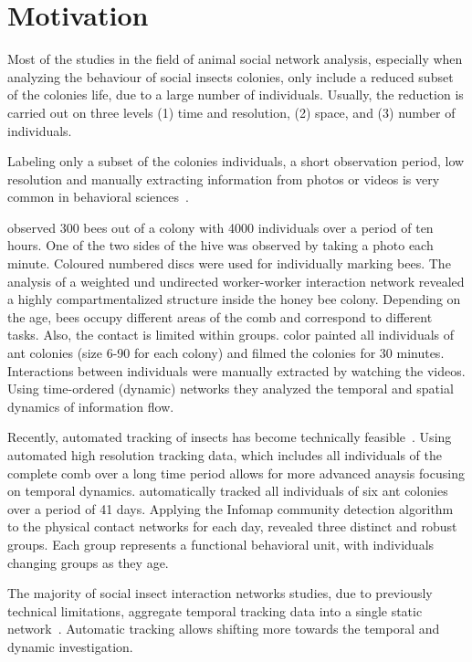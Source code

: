 \section{Motivation}
Most of the studies in the field of animal social network analysis, especially when analyzing the behaviour of social insects colonies, only include a reduced subset of the colonies life, due to a large number of individuals. Usually, the reduction is carried out on three levels (1) time and resolution, (2) space, and (3) number of individuals.

Labeling only a subset of the colonies individuals, a short observation period, low resolution and manually extracting information from photos or videos is very common in behavioral sciences~\cite{naug2008structure, quevillon2015social}.

\textcite{baracchi2014socio} observed 300 bees out of a colony with 4000 individuals over a period of ten hours. One of the two sides of the hive was observed by taking a photo each minute. Coloured numbered discs were used for individually marking bees. The analysis of a weighted und undirected worker-worker interaction network revealed a highly compartmentalized structure inside the honey bee colony. Depending on the age, bees occupy different areas of the comb and correspond to different tasks. Also, the contact is limited within groups. \textcite{blonder2011time} color painted all individuals of ant colonies (size 6-90 for each colony) and filmed the colonies for 30 minutes. Interactions between individuals were manually extracted by watching the videos. Using time-ordered (dynamic) networks they analyzed the temporal and spatial dynamics of information flow.

Recently, automated tracking of insects has become technically feasible~\cite{wario2015automatic, crall2015beetag, fiala2005comparing}.
Using automated high resolution tracking data, which includes all individuals of the complete comb over a long time period allows for more advanced anaysis focusing on temporal dynamics.
\textcite{mersch2013tracking} automatically tracked all individuals of six ant colonies over a period of 41 days. Applying the Infomap community detection algorithm to the physical contact networks for each day, revealed three distinct and robust groups. Each group represents a functional behavioral unit, with individuals changing groups as they age.

The majority of social insect interaction networks studies, due to previously technical limitations, aggregate temporal tracking data into a single static network~\cite[Chapter~15]{krause2014animal}.
Automatic tracking allows shifting more towards the temporal and dynamic investigation.


